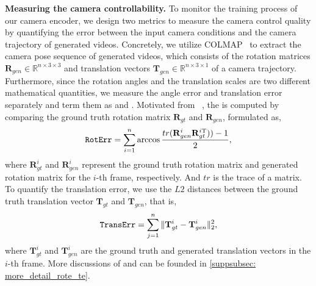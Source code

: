\noindent \textbf{Measuring the camera controllability.}
To monitor the training process of our camera encoder, we design two metrics to measure the camera control quality by quantifying the error between the input camera conditions and the camera trajectory of generated videos. 
%
Concretely, we utilize COLMAP~\citep{schoenberger2016sfm} to extract the camera pose sequence of generated videos, 
which consists of the rotation matrices $\mathbf{R}_{gen} \in \mathbb{R}^{n \times 3 \times 3}$ and translation vectors $\mathbf{T}_{gen}  \in \mathbb{R}^{n \times 3 \times 1}$ of a camera trajectory.
%
Furthermore, since the rotation angles and the translation scales are two different mathematical quantities, we measure the angle error and translation error separately and term them as \rote and \te.
%
Motivated from ~\citep{SO3rotationdistance}, the \rote is computed by comparing the ground truth rotation matrix $\mathbf{R}_{gt}$ and $\mathbf{R}_{gen}$, formulated as,
\begin{equation}
    \label{equ: roterr}
    \textcolor{black}{\mbox{\texttt{RotErr}}} = \sum_{i=1}^n \arccos{\frac{tr (\mathbf{R}_{gen}^{i} \mathbf{R}_{gt}^{i\mathrm{T}})) - 1}{2}},
\end{equation}
where $\mathbf{R}_{gt}^{i}$ and $\mathbf{R}_{gen}^{i}$ represent the ground truth rotation matrix and generated rotation matrix for the $i$-th frame, respectively. 
%
And $\textit{tr}$ is the trace of a matrix.
%
To quantify the translation error, we use the $L2$ distances between the ground truth translation vector $\mathbf{T}_{gt}$ and $\mathbf{T}_{gen}$, that is,
 \begin{equation}
     \label{equ: transerr}
     \textcolor{black}{\mbox{\texttt{TransErr}}} = \sum_{j=1}^n \|\mathbf{T}_{gt}^{i} - \mathbf{T}_{gen}^{i} \|_2^2 ,
 \end{equation}
 where $\mathbf{T}_{gt}^{i}$ and $\mathbf{T}_{gen}^{i}$ are the ground truth and generated translation vectors in the $i$-th frame.
 More discussions of \rote and \te can be founded in \cref{suppsubsec: more_detail_rote_te}.
 